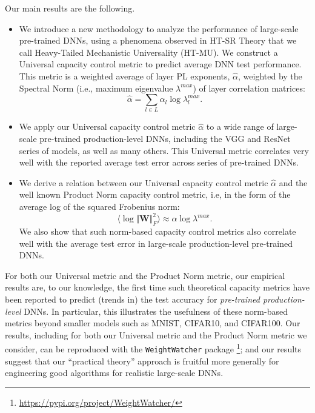 Our main results are the following.
\begin{itemize}
\item
We introduce a new methodology to analyze the performance of large-scale pre-trained DNNs, using a phenomena observed in HT-SR Theory that we call Heavy-Tailed Mechanistic Universality (HT-MU).
We construct a Universal capacity control metric to predict average DNN test performance.
This metric is a weighted average of layer PL exponents, $\hat{\alpha}$, weighted by the Spectral Norm (i.e., maximum eigenvalue $\lambda^{max}$) of layer correlation matrices: 
$$
\hat{\alpha}=\sum_{l\in L}\alpha_{l}\log\lambda_{l}^{max}  .
$$
\item
We apply our Universal capacity control metric $\hat{\alpha}$ to a wide range of large-scale pre-trained production-level DNNs, including the VGG and ResNet series of models, as well as many others.
This Universal metric correlates very well with the reported average test error across series of pre-trained DNNs.
\item
We derive a relation between our Universal capacity control metric $\hat{\alpha}$ and the well known Product Norm capacity control metric, i.e, in the form of the average log of the squared Frobenius norm:
$$
\langle\log\Vert\mathbf{W}\Vert^{2}_{F}\rangle\approx \alpha\log\lambda^{max}  .
$$
We also show that
such norm-based capacity control metrics also correlate well with the average test error in large-scale production-level pre-trained DNNs.
\end{itemize}


For both our Universal metric and the Product Norm metric, our empirical results are, to our knowledge, the first time such theoretical capacity metrics have been reported to predict (trends in) the test accuracy for \emph{pre-trained production-level} DNNs.
In particular, this illustrates the usefulness of these norm-based metrics beyond smaller models such as MNIST, CIFAR10, and CIFAR100. 
Our 
results, including for both our Universal metric and the Product Norm metric we consider, can be reproduced with the \texttt{WeightWatcher} package%
\footnote{\url{https://pypi.org/project/WeightWatcher/}};
and our
results suggest that our ``practical theory'' approach is fruitful more generally for engineering good algorithms for realistic large-scale DNNs.


